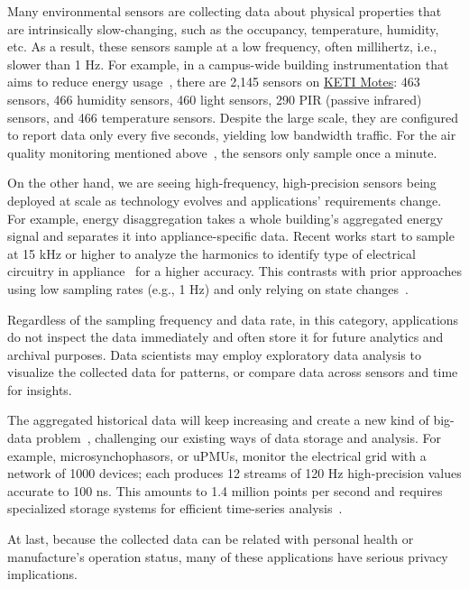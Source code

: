 Many environmental sensors are collecting data about physical properties that
are intrinsically slow-changing, such as the occupancy, temperature, humidity,
etc. As a result, these sensors sample at a low frequency, often millihertz,
i.e., slower than 1 Hz. For example, in a campus-wide building instrumentation
that aims to reduce energy usage~\cite{krioukov2012building}, there are 2,145
sensors on \href{http://www.keti.re.kr/}{KETI Motes}: 463  sensors, 466
humidity sensors, 460 light sensors, 290 PIR (passive infrared) sensors, and 466
temperature sensors. Despite the large scale, they are configured to report data
only every five seconds, yielding low bandwidth traffic. For the air quality
monitoring mentioned above~\cite{cheng2014aircloud}, the sensors only sample
once a minute.

On the other hand, we are seeing high-frequency, high-precision sensors being
deployed at scale as technology evolves and applications' requirements
change. For example, energy disaggregation takes a whole building's aggregated
energy signal and separates it into appliance-specific data. Recent works start
to sample at 15 kHz or higher to analyze the harmonics to identify type of
electrical circuitry in appliance~\cite{kolter2011redd} for a higher
accuracy. This contrasts with prior approaches using low sampling rates (e.g., 1
Hz) and only relying on state changes~\cite{hart1992nonintrusive}.

Regardless of the sampling frequency and data rate, in this category,
applications do not inspect the data immediately and often store it for future
analytics and archival purposes. Data scientists may employ exploratory data
analysis to visualize the collected data for patterns, or compare data across
sensors and time for insights.

The aggregated historical data will keep increasing and create a new kind of
big-data problem~\cite{diaz2012big, zaslavsky2013sensing}, challenging our
existing ways of data storage and analysis. For example, microsynchophasors, or
uPMUs, monitor the electrical grid with a network of 1000 devices; each produces
12 streams of 120 Hz high-precision values accurate to 100 ns. This amounts to
1.4 million points per second and requires specialized storage systems for
efficient time-series analysis~\cite{andersen2016btrdb}.

At last, because the collected data can be related with personal health or
manufacture's operation status, many of these applications have serious privacy
implications.

